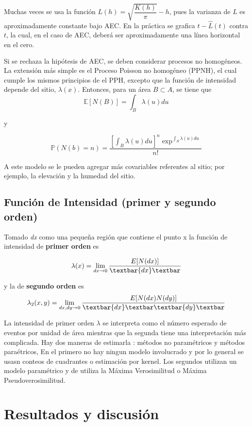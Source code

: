\documentclass[12,]{article}
\begin{document}
Muchas veces se usa la función $L(h) = \sqrt{\dfrac{K(h)}{\pi}} - h$,
pues la varianza de $L$ es aproximadamente constante bajo AEC. En la
práctica se grafica $t - \hat{L}(t)$ contra $t$, la cual, en el caso de
AEC, deberá ser aproximadamente una línea horizontal en el cero.

Si se rechaza la hipótesis de AEC, se deben considerar procesos no
homogéneos. La extensión más simple es el Proceso Poisson no homogéneo
(PPNH), el cual cumple los mismos principios de el PPH, excepto que la
función de intensidad depende del sitio, $\lambda(x)$. Entonces, para un
área $B \subset A$, se tiene que \[
\mathbb{E}[N(B)] = \int_{B} \lambda(u) du
\]

y

\[
\mathbb{P}(N(b) = n) = \dfrac{[\int_{B} \lambda(u) du]^n \exp^{\int_{B} \lambda(u) du}}{n!}
\]

A este modelo se le pueden agregar más covariables referentes al sitio;
por ejemplo, la elevación y la humedad del sitio.

\subsection{Función de Intensidad (primer y segundo
orden)}\label{funcion-de-intensidad-primer-y-segundo-orden}

Tomado \emph{dx} como una pequeña región que contiene el punto x la
función de intensidad de \textbf{primer orden} es

\[
\lambda(x) = \displaystyle\lim_{dx \rightarrow 0} \dfrac{E[N(dx)]} {\textbar{dx}\textbar}
\]

y la de \textbf{segundo orden} es \[
\lambda_2(x,y) = \displaystyle\lim_{dx, dy \rightarrow 0} \dfrac{E[N(dx)N(dy)]} {\textbar{dx}\textbar \textbar{dy}\textbar}
\]

La intensidad de primer orden $\lambda$ se interpreta como el número
esperado de eventos por unidad de área mientras que la segunda tiene una
interpretación más complicada. Hay dos maneras de estimarla : métodos no
paramétricos y métodos paraétricos, En el primero no hay ningun modelo
involucrado y por lo general se usasn conteos de cuadrantes o estimación
por kernel. Los segundos utilizan un modelo paramétrico y de utiliza la
Máxima Verosimilitud o Máxima Pseudoverosimilitud.

\section{Resultados y discusión}\label{resultados-y-discusion}
\end{document}
